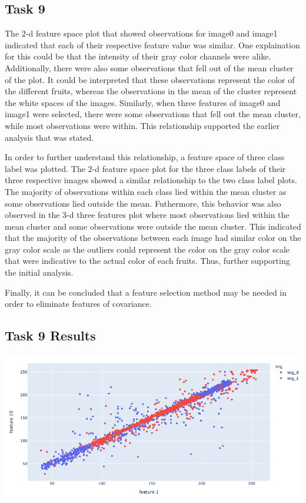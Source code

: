 \documentclass{article}
\begin{document}
\begin{multicols}{2}
	\section{Task 9}
	The 2-d feature space plot that showed 
	observations for image0 and image1 indicated 
	that each of their respective feature value was similar. 
	One explaination for this could be that the intensity 
	of their gray color channels were alike. Additionally, 
	there were also some observations that fell out of the 
	mean cluster of the plot. It could be interpreted that 
	these observations represent the color of the different 
	fruits, whereas the observations in the mean of the cluster 
	represent the white spaces of the images. Similarly, 
	when three features of image0 and image1 were selected, 
	there were some observations that fell out the mean cluster, 
	while most observations were within. This relationship supported 
	the earlier analysis that was stated. 
	
	In order to further understand this relationship, 
	a feature space of three class label was plotted. 
	The 2-d feature space plot for the three class labels 
	of their three respective images showed a similar 
	relationship to the two class label plots. 
	The majority of observations within each class 
	lied within the mean cluster as some observations 
	lied outside the mean. Futhermore, this behavior 
	was also observed in the 3-d three features plot 
	where most observations lied within the mean cluster 
	and some observations were outside the mean cluster. 
	This indicated that the majority of the observations 
	between each image had similar color on the gray color 
	scale as the outliers could represent the color on the 
	gray color scale that were indicative to the actual color 
	of each fruits. Thus, further supporting the initial analysis.
	
	Finally, it can be concluded that a feature selection method may be 
	needed in order to eliminate features of covariance. 
	
	\subsection{Task 9 Results}
	\centering
	\includegraphics[scale=0.2]{../screenshots/2d01.png}
	

\end{multicols}
\end{document}
